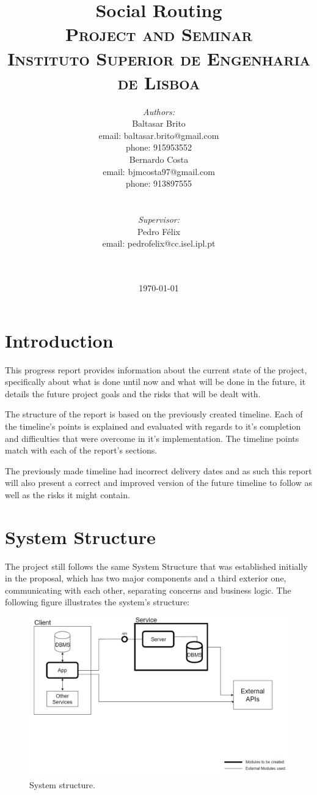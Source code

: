 \documentclass{article}
\title{
    \vspace{-4.0cm}
    {\Huge Social Routing}\\[0.5cm]    
    \textsc{\Large Project and Seminar}\\[0.5cm]
    \textsc{\large Instituto Superior de Engenharia de Lisboa}\\[0.5cm]
}
\date{\today}
\author{   
    \begin{minipage}{0.4\textwidth}
        \begin{flushleft} \large
        \emph{Authors:}\\
        Baltasar Brito\\
        {\small email: baltasar.brito@gmail.com}\\
        {\small phone: 915953552}\\
        Bernardo Costa\\
        {\small email: bjmcosta97@gmail.com}\\
        {\small phone: 913897555}\\
        \end{flushleft}
    \end{minipage}
    ~
    \begin{minipage}{0.4\textwidth}
        \begin{flushright} \large
        \emph{Supervisor:} \\ 
        Pedro Félix\\
        {\small email: pedrofelix@cc.isel.ipl.pt}\\  
        \end{flushright}
    \end{minipage}\\[2cm]  
}
\begin{document}
     
    
    \maketitle

    \newpage

    \tableofcontents

    \newpage

    \section{Introduction}
        This progress report provides information about the current state of the project, specifically about what is done until now and what will 
        be done in the future, it details the future project goals and the risks that will be dealt with.\par
        The structure of the report is based on the previously created timeline. Each of the timeline's points is explained and evaluated with regards to it's 
        completion and difficulties that were overcome in it's implementation. The timeline points match with each of the report's sections.\par
        The previously made timeline had incorrect delivery dates and as such this report will also present a correct and improved version 
        of the future timeline to follow as well as the risks it might contain.
        
        \newpage
    
    \section{System Structure}
        The project still follows the same System Structure that was established initially in the proposal, which has two major components and a 
        third exterior one, communicating with each other, separating concerns and business logic. The following figure illustrates the system's structure:
        
        \begin{figure}[h]            
            \includegraphics[width=\textwidth]{images/project-structure/system-structure.PNG}
            \caption{System structure.}
            \label{fig:systemstructure}
        \end{figure}  
        \newpage    
\end{document}
